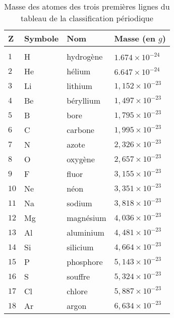 \begin{table*}[!h]
  \centering
  \begin{tabu} to 1.2\columnwidth { X[0.1,c] X[0.2,c] X[0.2,l] X[0.3,l]}
      \hline 
      \textbf{Z} & \textbf{Symbole} & \textbf{Nom} & \textbf{Masse (en $g$)} \\			
      \hline \\[-10pt]
      $1$	&H	& hydrogène	&$1.674 \times 10^{-24}$ \\
      $2$	&He	&hélium	& 	$6.647 \times 10^{-24}$ \\
      $3$	&Li	&lithium & 	$1,152 \times 10^{-23}$ \\
      $4$	&Be	&béryllium & 	$1,497 \times 10^{-23}$ \\
      $5$	&B	&bore & 	$1,795 \times 10^{-23}$ \\
      $6$	&C	&carbone &	$1,995 \times 10^{-23}$ \\
      $7$	&N	&azote & 	$2,326 \times 10^{-23}$ \\
      $8$	&O	&oxygène & 	$2,657 \times 10^{-23}$ \\
      $9$	&F	&fluor	& 	$3,155 \times 10^{-23}$ \\
      $10$	&Ne	&néon	& 	$3,351 \times 10^{-23}$ \\
      $11$	&Na	&sodium	& 	$3,818 \times 10^{-23}$ \\
      $12$	&Mg	&magnésium& 	$4,036 \times 10^{-23}$ \\
      $13$	&Al	&aluminium&	$4,481 \times 10^{-23}$ \\
      $14$	&Si	&silicium& 	$4,664 \times 10^{-23}$ \\
      $15$	&P	&phosphore& 	$5,143 \times 10^{-23}$ \\
      $16$	&S	&souffre& 	$5,324 \times 10^{-23}$ \\
      $17$	&Cl	&chlore	& 	$5,887 \times 10^{-23}$ \\
      $18$	&Ar	&argon	& 	$6,634 \times 10^{-23}$ \\
      \hline 
  \end{tabu}
  \caption{Masse des atomes des trois premières lignes du tableau de la classification périodique}
  \label{tab:masse-atomes-tab-periodique}
\end{table*}



